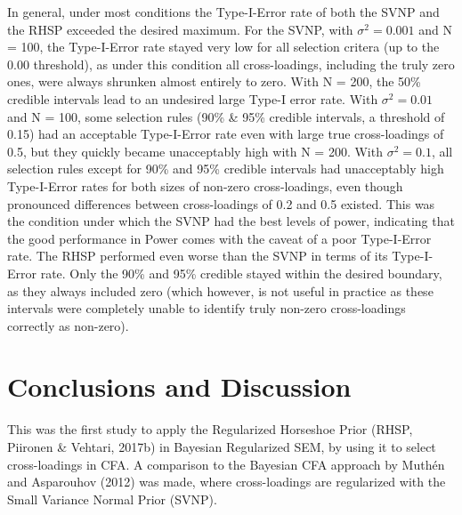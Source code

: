 \documentclass[
  man, donotrepeattitle,floatsintext]{apa6}
\begin{document}
In general, under most conditions the Type-I-Error rate of both the SVNP and the RHSP exceeded the desired maximum. For the SVNP, with \(\sigma^2 = 0.001\) and N = 100, the Type-I-Error rate stayed very low for all selection critera (up to the 0.00 threshold), as under this condition all cross-loadings, including the truly zero ones, were always shrunken almost entirely to zero. With N = 200, the 50\% credible intervals lead to an undesired large Type-I error rate. With \(\sigma^2 = 0.01\) and N = 100, some selection rules (90\% \& 95\% credible intervals, a threshold of 0.15) had an acceptable Type-I-Error rate even with large true cross-loadings of 0.5, but they quickly became unacceptably high with N = 200. With \(\sigma^2 = 0.1\), all selection rules except for 90\% and 95\% credible intervals had unacceptably high Type-I-Error rates for both sizes of non-zero cross-loadings, even though pronounced differences between cross-loadings of 0.2 and 0.5 existed. This was the condition under which the SVNP had the best levels of power, indicating that the good performance in Power comes with the caveat of a poor Type-I-Error rate. The RHSP performed even worse than the SVNP in terms of its Type-I-Error rate. Only the 90\% and 95\% credible stayed within the desired boundary, as they always included zero (which however, is not useful in practice as these intervals were completely unable to identify truly non-zero cross-loadings correctly as non-zero).

\hypertarget{conclusions-and-discussion}{%
\section{Conclusions and Discussion}\label{conclusions-and-discussion}}

This was the first study to apply the Regularized Horseshoe Prior (RHSP, Piironen \& Vehtari, 2017b) in Bayesian Regularized SEM, by using it to select cross-loadings in CFA. A comparison to the Bayesian CFA approach by Muthén and Asparouhov (2012) was made, where cross-loadings are regularized with the Small Variance Normal Prior (SVNP).
\end{document}
